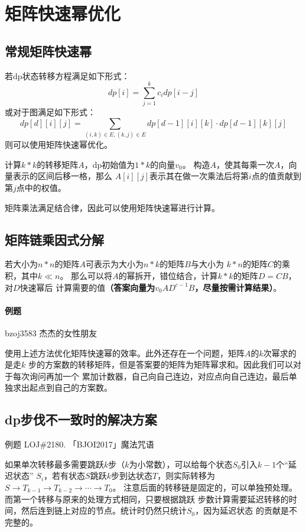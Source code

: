 \section{矩阵快速幂优化}
\subsection{常规矩阵快速幂}
若dp状态转移方程满足如下形式：
\begin{displaymath}
    dp[i]=\sum_{j=1}^k{c_idp[i-j]}
\end{displaymath}
或对于图满足如下形式：
\begin{displaymath}
    dp[d][i][j]=\sum_{(i,k)\in E,(k,j)\in E}{dp[d-1][i][k]\cdot dp[d-1][k][j]}
\end{displaymath}
则可以使用矩阵快速幂优化。

计算$k*k$的转移矩阵$A$，dp初始值为$1*k$的向量$v_0$。
构造$A$，使其每乘一次$A$，向量表示的区间后移一格，那么
$A[i][j]$表示其在做一次乘法后将第$i$点的值贡献到第$j$点中的权值。

矩阵乘法满足结合律，因此可以使用矩阵快速幂进行计算。

\subsection{矩阵链乘因式分解}

若大小为$n*n$的矩阵$A$可表示为大小为$n*k$的矩阵$B$与大小为
$k*n$的矩阵$C$的乘积，其中$k\ll n$。
那么可以将$A$的幂拆开，错位结合，计算$k*k$的矩阵$D=CB$，对$D$快速幂后
计算需要的值{\bfseries （答案向量为$v_0AD^{c-1}B$，尽量按需计算结果）}。

\paragraph{例题} bzoj3583 杰杰的女性朋友

使用上述方法优化矩阵快速幂的效率。此外还存在一个问题，矩阵$A$的$k$次幂求的是走$k$
步的方案数的转移矩阵，但是答案要的矩阵为矩阵幂求和。因此我们可以对于每次询问再加一个
累加计数器，自己向自己连边，对应点向自己连边，最后单独求出起点到自己的方案数。

\subsection{dp步伐不一致时的解决方案}
例题 LOJ\#2180. 「BJOI2017」魔法咒语

如果单次转移最多需要跳跃$k$步（$k$为小常数），可以给每个状态$S_0$引入$k-1$个``延迟状态''
$S_i$，若有状态$S$跳跃$k$步到达状态$T$，则实际转移为
$S\rightarrow T_{k-1} \rightarrow T_{k-2} \rightarrow \cdots \rightarrow T_0$。
注意后面的转移链是固定的，可以单独预处理。而第一个转移与原来的处理方式相同，只要根据跳跃
步数计算需要延迟转移的时间，然后连到链上对应的节点。统计时仍然只统计$S_0$，因为延迟状态
的贡献是不完整的。
